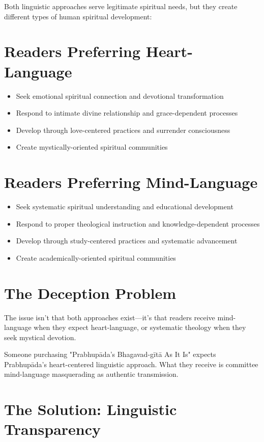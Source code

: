 \documentclass[11pt,twoside]{book}
\begin{document}
Both linguistic approaches serve legitimate spiritual needs, but they create different types of human spiritual development:
\section*{Readers Preferring Heart-Language}
\label{sec:orga2cad2e}
\begin{itemize}
\item Seek emotional spiritual connection and devotional transformation
\item Respond to intimate divine relationship and grace-dependent processes
\item Develop through love-centered practices and surrender consciousness
\item Create mystically-oriented spiritual communities
\end{itemize}
\section*{Readers Preferring Mind-Language}
\label{sec:orgbdc1a0e}
\begin{itemize}
\item Seek systematic spiritual understanding and educational development
\item Respond to proper theological instruction and knowledge-dependent processes
\item Develop through study-centered practices and systematic advancement
\item Create academically-oriented spiritual communities
\end{itemize}
\section*{The Deception Problem}
\label{sec:org3e963d7}

The issue isn't that both approaches exist—it's that readers receive mind-language when they expect heart-language, or systematic theology when they seek mystical devotion.

Someone purchasing "Prabhupāda's Bhagavad-gītā As It Is" expects Prabhupāda's heart-centered linguistic approach. What they receive is committee mind-language masquerading as authentic transmission.
\section*{The Solution: Linguistic Transparency}
\label{sec:org62a8467}
\end{document}
